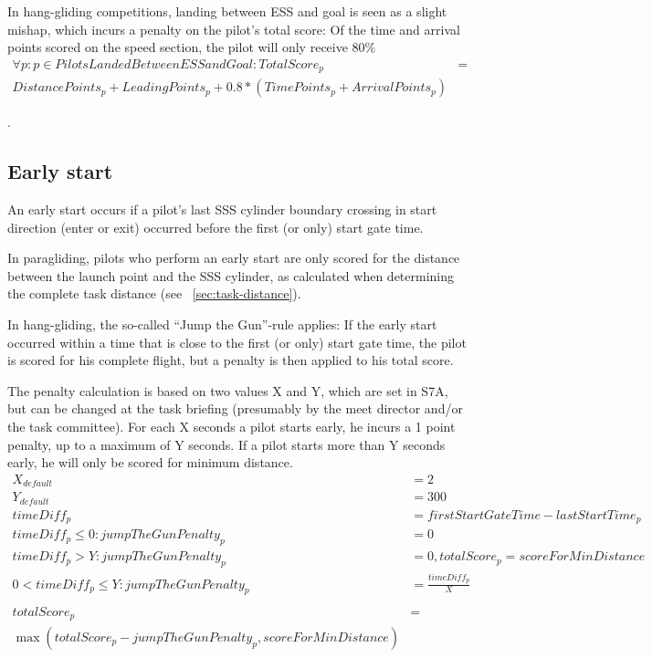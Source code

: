 \documentclass{article}
\begin{document}
\begin{hg}
In hang-gliding competitions, landing between ESS and goal is seen as a slight
mishap, which incurs a penalty on the pilot’s total score: Of the time and
arrival points scored on the speed section, the pilot will only receive
80\%\footnotemark
\begin{align*}
    \forall p : p \in PilotsLandedBetweenESSandGoal : TotalScore_p &= \\
    DistancePoints_p + LeadingPoints_p + 0.8 * (TimePoints_p + ArrivalPoints_p)
\end{align*}
\end{hg}
.

\subsection{Early start}
\label{sec:early-start}
An early start occurs if a pilot’s last SSS cylinder boundary crossing in start
direction (enter or exit) occurred before the first (or only) start gate time.

\begin{pg}
In paragliding, pilots who perform an early start are only scored for the
distance between the launch point and the SSS cylinder, as calculated when
determining the complete task distance (see ~\ref{sec:task-distance}).
\end{pg}

\begin{hg}
In hang-gliding, the so-called “Jump the Gun”-rule applies: If the early start
occurred within a time that is close to the first (or only) start gate time,
the pilot is scored for his complete flight, but a penalty is then applied to
his total score.

The penalty calculation is based on two values X and Y, which are set in S7A,
but can be changed at the task briefing (presumably by the meet director and/or
the task committee). For each X seconds a pilot starts early, he incurs
a 1 point penalty, up to a maximum of Y seconds. If a pilot starts more than
Y seconds early, he will only be scored for minimum distance.
\begin{align*}
    X_{default} &= 2 \\
    Y_{default} &= 300 \\
    timeDiff_p &= firstStartGateTime - lastStartTime_p \\
    timeDiff_p \leq 0 : jumpTheGunPenalty_p &= 0 \\
    timeDiff_p > Y : jumpTheGunPenalty_p &= 0, totalScore_p = scoreForMinDistance \\
    0 < timeDiff_p \leq Y : jumpTheGunPenalty_p &= \frac{timeDiff_p}{X} \\
    \\
    totalScore_p &= \\
    \max(totalScore_p - jumpTheGunPenalty_p, scoreForMinDistance)
\end{align*}
\end{hg}
\end{document}
